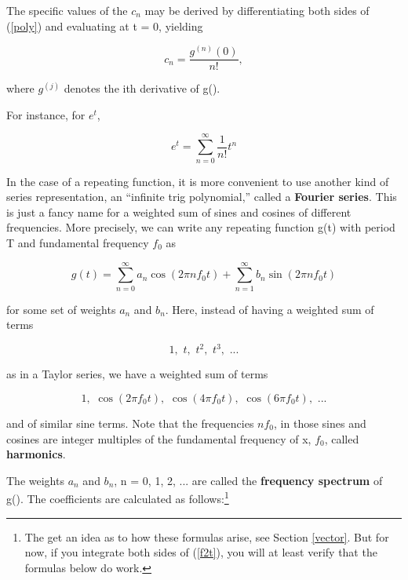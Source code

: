 The specific values of the $c_n$ may be derived by differentiating both
sides of (\ref{poly}) and evaluating at t = 0, yielding 

\begin{equation}
c_n = \frac{g^{(n)}(0)}{n!},
\end{equation}

where $g^{(j)}$ denotes the ith derivative of g().

For instance, for \( e^{t} \),

\begin{equation}
\label{exptaylor}
e^{t}=\sum _{n=0}^{\infty }\frac{1}{n!}t^{n}
\end{equation}

In the case of a repeating function, it is more convenient to use
another kind of series representation, an ``infinite trig polynomial,''
called  a {\bf Fourier series}.  This is just a fancy name for a
weighted sum of sines and cosines of different frequencies.  More
precisely, we can write any repeating function g(t) with period T and
fundamental frequency $f_0$ as    

\begin{equation} 
\label{f2t}
g(t)={\sum _{n=0}^{\infty }{a_{n}}\cos (2\pi nf_{0}t)}+{\sum _{n=1}^{\infty }{b_{n}}\sin (2\pi nf_{0}t)}
\end{equation}

for some set of weights $a_n$ and $b_n$.  Here, instead of having a
weighted sum of terms

\begin{equation}
1,\, \, t,\, \, t^{2},\, \, t^{3},\, \, ...
\end{equation}

as in a Taylor series, we have a weighted sum of terms

\begin{equation}
1,\, \, \cos (2\pi f_{0}t),\, \, \cos (4\pi f_{0}t),\, \, \cos (6\pi f_{0}t),\, \, ...
\end{equation}

and of similar sine terms. Note that the frequencies $nf_0$, in those
sines and cosines are integer multiples of the fundamental frequency of
x, $f_{0}$, called \textbf{harmonics}. 

The weights $a_n$ and $b_n$, n = 0, 1, 2, ... are called the
\textbf{frequency spectrum} of g().  The coefficients are calculated as
follows:\footnote{The get an idea as to how these formulas arise, see
Section \ref{vector}.  But for now, if you integrate both sides of
(\ref{f2t}), you will at least verify that the formulas below do work.}

